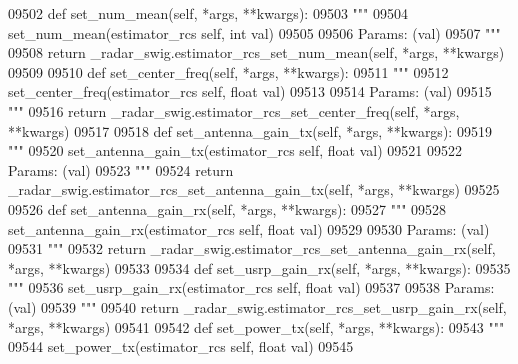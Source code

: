 \begin{DoxyCode}
{{{{{{{{{{{{{{{{{{{{{{{{{{{{{{{09502     \textcolor{keyword}{def }set_num_mean(self, *args, **kwargs):
09503         \textcolor{stringliteral}{"""}
09504 \textcolor{stringliteral}{        set\_num\_mean(estimator\_rcs self, int val)}
09505 \textcolor{stringliteral}{}
09506 \textcolor{stringliteral}{        Params: (val)}
09507 \textcolor{stringliteral}{        """}
09508         \textcolor{keywordflow}{return} \_radar\_swig.estimator\_rcs\_set\_num\_mean(self, *args, **kwargs)
09509 
09510     \textcolor{keyword}{def }set_center_freq(self, *args, **kwargs):
09511         \textcolor{stringliteral}{"""}
09512 \textcolor{stringliteral}{        set\_center\_freq(estimator\_rcs self, float val)}
09513 \textcolor{stringliteral}{}
09514 \textcolor{stringliteral}{        Params: (val)}
09515 \textcolor{stringliteral}{        """}
09516         \textcolor{keywordflow}{return} \_radar\_swig.estimator\_rcs\_set\_center\_freq(self, *args, **kwargs)
09517 
09518     \textcolor{keyword}{def }set_antenna_gain_tx(self, *args, **kwargs):
09519         \textcolor{stringliteral}{"""}
09520 \textcolor{stringliteral}{        set\_antenna\_gain\_tx(estimator\_rcs self, float val)}
09521 \textcolor{stringliteral}{}
09522 \textcolor{stringliteral}{        Params: (val)}
09523 \textcolor{stringliteral}{        """}
09524         \textcolor{keywordflow}{return} \_radar\_swig.estimator\_rcs\_set\_antenna\_gain\_tx(self, *args, **kwargs)
09525 
09526     \textcolor{keyword}{def }set_antenna_gain_rx(self, *args, **kwargs):
09527         \textcolor{stringliteral}{"""}
09528 \textcolor{stringliteral}{        set\_antenna\_gain\_rx(estimator\_rcs self, float val)}
09529 \textcolor{stringliteral}{}
09530 \textcolor{stringliteral}{        Params: (val)}
09531 \textcolor{stringliteral}{        """}
09532         \textcolor{keywordflow}{return} \_radar\_swig.estimator\_rcs\_set\_antenna\_gain\_rx(self, *args, **kwargs)
09533 
09534     \textcolor{keyword}{def }set_usrp_gain_rx(self, *args, **kwargs):
09535         \textcolor{stringliteral}{"""}
09536 \textcolor{stringliteral}{        set\_usrp\_gain\_rx(estimator\_rcs self, float val)}
09537 \textcolor{stringliteral}{}
09538 \textcolor{stringliteral}{        Params: (val)}
09539 \textcolor{stringliteral}{        """}
09540         \textcolor{keywordflow}{return} \_radar\_swig.estimator\_rcs\_set\_usrp\_gain\_rx(self, *args, **kwargs)
09541 
09542     \textcolor{keyword}{def }set_power_tx(self, *args, **kwargs):
09543         \textcolor{stringliteral}{"""}
09544 \textcolor{stringliteral}{        set\_power\_tx(estimator\_rcs self, float val)}
09545 \textcolor{stringliteral}{}
}}}}}}}}}}}}}}}}}}}}}}}}}}}}}}}
\end{DoxyCode}
